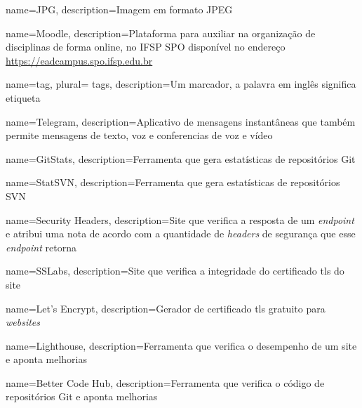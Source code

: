  {
    name=JPG,
    description={Imagem em formato JPEG}
}

 {
    name=Moodle,
    description={Plataforma para auxiliar na organização de disciplinas de forma online, no IFSP SPO disponível no endereço \url{https://eadcampus.spo.ifsp.edu.br}}
}


 {
    name=tag,
    plural= {tags},
    description={Um marcador, a palavra em inglês significa etiqueta}
}
                
 {
    name=Telegram,
    description={Aplicativo de mensagens instantâneas que também permite mensagens de texto, voz e conferencias de voz e vídeo}
}

 {
	name=GitStats,
	description={Ferramenta que gera estatísticas de repositórios Git}
}

 {
	name=StatSVN,
	description={Ferramenta que gera estatísticas de repositórios SVN}
}

 {
	name=Security Headers,
	description={Site que verifica a resposta de um \emph{endpoint} e atribui uma nota de acordo com a quantidade de \emph{headers} de segurança que esse \emph{endpoint} retorna}
}

 {
	name=SSLabs,
	description={Site que verifica a integridade do certificado \ac{tls} do site}
}

 {
	name=Let's Encrypt,
	description={Gerador de certificado \ac{tls} gratuito para \emph{websites}}
}

 {
	name=Lighthouse,
	description={Ferramenta que verifica o desempenho de um site e aponta melhorias}
}

 {
	name=Better Code Hub,
	description={Ferramenta que verifica o código de repositórios Git e aponta melhorias}
}